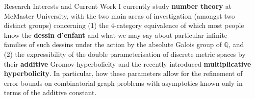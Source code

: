 \begin{rSection}{Research Interests and Current Work}
I currently study {\bf number theory} at McMaster University, with the two main areas of investigation (amongst two distinct groups) concerning (1) the 4-category equivalence of which most people know the {\bf dessin d'enfant} and what we may say about particular infinite families of such dessins under the action by the absolute Galois group of $\mathbb{Q}$, and (2) the expressibility of the double parameterisation of discrete metric spaces by their {\bf additive} Gromov hyperbolicity and the recently introduced {\bf multiplicative hyperbolicity}. In particular, how these parameters allow for the refinement of error bounds on combinatorial graph problems with asymptotics known only in terms of the additive constant.









\end{rSection}
